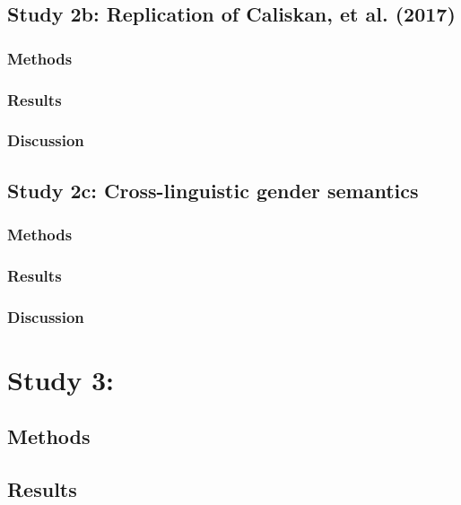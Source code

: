 \documentclass[man]{apa6}
\theoremstyle{definition}
\theoremstyle{definition}
\theoremstyle{definition}
\theoremstyle{remark}
\begin{document}
\subsection{Study 2b: Replication of Caliskan, et al.
(2017)}\label{study-2b-replication-of-caliskan-et-al.-2017}

\subsubsection{Methods}\label{methods-2}

\subsubsection{Results}\label{results-2}

\subsubsection{Discussion}\label{discussion-2}

\subsection{Study 2c: Cross-linguistic gender
semantics}\label{study-2c-cross-linguistic-gender-semantics}

\subsubsection{Methods}\label{methods-3}

\subsubsection{Results}\label{results-3}

\subsubsection{Discussion}\label{discussion-3}

\section{Study 3:}\label{study-3}

\subsection{Methods}\label{methods-4}

\subsection{Results}\label{results-4}
\end{document}
